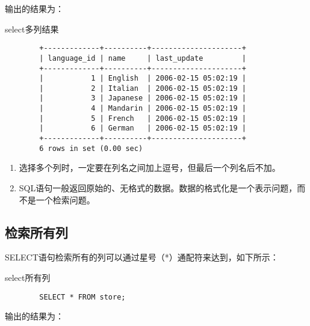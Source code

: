 \documentclass[UTF8]{article}
\begin{document}
输出的结果为：

\begin{listing}[H]
	\caption{select多列结果}
	\label{code:resultofselectcolumns}
	\begin{verbatim}
        +-------------+----------+---------------------+
        | language_id | name     | last_update         |
        +-------------+----------+---------------------+
        |           1 | English  | 2006-02-15 05:02:19 |
        |           2 | Italian  | 2006-02-15 05:02:19 |
        |           3 | Japanese | 2006-02-15 05:02:19 |
        |           4 | Mandarin | 2006-02-15 05:02:19 |
        |           5 | French   | 2006-02-15 05:02:19 |
        |           6 | German   | 2006-02-15 05:02:19 |
        +-------------+----------+---------------------+
        6 rows in set (0.00 sec)
\end{verbatim}
\end{listing}

\begin{orangebox}[frametitle={Tips 4.2}]
\begin{enumerate}
    \item 选择多个列时，一定要在列名之间加上逗号，但最后一个列名后不加。
    \item SQL语句一般返回原始的、无格式的数据。数据的格式化是一个表示问题，而不是一个检索问题。
\end{enumerate}
\end{orangebox}

\subsection{检索所有列}
SELECT语句检索所有的列可以通过星号（*）通配符来达到，如下所示：
\begin{listing}[H]
	\caption{select所有列}
	\label{code:selectallcolumns}
	\begin{verbatim}
        SELECT * FROM store;
\end{verbatim}
\end{listing}

输出的结果为：
\end{document}
